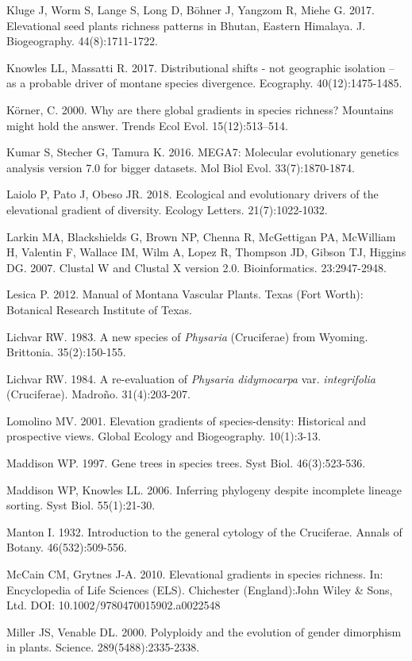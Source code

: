 Kluge J, Worm S, Lange S, Long D, Böhner J, Yangzom R, Miehe G. 2017. Elevational seed plants richness patterns in Bhutan, Eastern Himalaya. J. Biogeography. 44(8):1711-1722.

Knowles LL, Massatti R. 2017. Distributional shifts - not geographic isolation – as a probable driver of montane species divergence. Ecography. 40(12):1475-1485.

Körner, C. 2000. Why are there global gradients in species richness? Mountains might hold the answer. Trends Ecol Evol. 15(12):513–514.

Kumar S, Stecher G, Tamura K. 2016. MEGA7: Molecular evolutionary genetics analysis version 7.0 for bigger datasets. Mol Biol Evol. 33(7):1870-1874.

Laiolo P, Pato J, Obeso JR. 2018. Ecological and evolutionary drivers of the elevational gradient of diversity. Ecology Letters. 21(7):1022-1032.

Larkin MA, Blackshields G, Brown NP, Chenna R, McGettigan PA, McWilliam H, Valentin F, Wallace IM, Wilm A, Lopez R, Thompson JD, Gibson TJ, Higgins DG. 2007. Clustal W and Clustal X version 2.0. Bioinformatics. 23:2947-2948. 

Lesica P. 2012. Manual of Montana Vascular Plants. Texas (Fort Worth): Botanical Research Institute of Texas.

Lichvar RW. 1983. A new species of \textit{Physaria} (Cruciferae) from Wyoming.  Brittonia. 35(2):150-155.

Lichvar RW. 1984. A re-evaluation of \textit{Physaria didymocarpa} var. \textit{integrifolia} (Cruciferae). Madroño. 31(4):203-207.

Lomolino MV. 2001. Elevation gradients of species-density: Historical and prospective views. Global Ecology and Biogeography. 10(1):3-13.

Maddison WP. 1997. Gene trees in species trees. Syst Biol. 46(3):523-536.

Maddison WP, Knowles LL. 2006. Inferring phylogeny despite incomplete lineage sorting. Syst Biol. 55(1):21-30.

Manton I. 1932. Introduction to the general cytology of the Cruciferae. Annals of Botany. 46(532):509-556.

McCain CM, Grytnes J-A. 2010. Elevational gradients in species richness. In: Encyclopedia of Life Sciences (ELS). Chichester (England):John Wiley \& Sons, Ltd.  DOI: 10.1002/9780470015902.a0022548

Miller JS, Venable DL. 2000. Polyploidy and the evolution of gender dimorphism in plants. Science. 289(5488):2335-2338.

